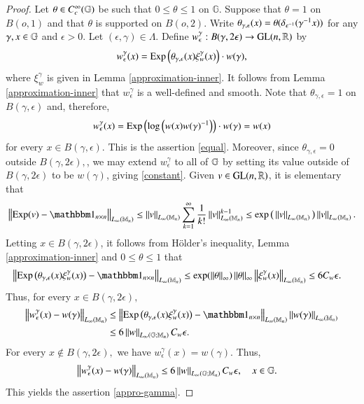 \documentclass[leqno]{amsart}
\begin{document}
	\begin{proof} Let $\theta\in C_{c}^{\infty}(\mathbb{G})$ be such that $0\leq\theta\leq 1$ on $\mathbb{G}.$ Suppose that $\theta=1$ on $B(o,1)$ and that $\theta$ is supported on $B(o,2).$ Write $\theta_{\gamma,\epsilon}(x)=\theta(\delta_{\epsilon^{-1}}(\gamma^{-1}x))$ for any $\gamma,x\in\mathbb{G}$ and $\epsilon>0$. Let $(\epsilon, \gamma)\in\Lambda$. Define $w^\gamma_\epsilon:B(\gamma, 2\epsilon)\to{\rm GL}(n,\mathbb{R})$ by
		\begin{align*}
			w^\gamma_\epsilon(x)=\operatorname{\rm Exp}\Big(\theta_{\gamma,\epsilon}(x)\xi^{\gamma}_{w}(x)\Big)\cdot w(\gamma),
		\end{align*}
		where $\xi^{\gamma}_{w}$ is given in Lemma \ref{approximation-inner}. It follows from Lemma \ref{approximation-inner} that $w^\gamma_\epsilon$ is a well-defined and smooth. Note that $\theta_{\gamma,\epsilon}=1$ on $B(\gamma,\epsilon)$ and, therefore, 
		\begin{align*}
			w^\gamma_\epsilon(x)=\operatorname{\rm Exp}\Big(\!\log\Big(w(x)w(\gamma)^{-1}\Big)\Big)\cdot w(\gamma)=w(x)
		\end{align*}
		for every $x\in B(\gamma,\epsilon).$ This is the assertion \eqref{equal}. Moreover, since $\theta_{\gamma,\epsilon}=0$ outside $B(\gamma,2\epsilon),$, we may extend $w^\gamma_\epsilon$ to all of $\mathbb{G}$ by setting its value outside of $B(\gamma, 2\epsilon)$ to be $w(\gamma)$, giving \eqref{constant}. Given $v\in{\rm GL}(n,\mathbb{R})$, it is elementary that
		\begin{align*}
			\Norm{\Exp(v)-\unit_{n\times n}}_{\lm{n}}
			\leq\Norm{v}_{\lm{n}}\sum_{k=1}^{\infty}\frac{1}{k!}\Norm{v}_{\lm{n}}^{k-1}
			\leq \exp\big(\Norm{v}_{\lm{n}}\big)\Norm{v}_{\lm{n}}.
		\end{align*}
		Letting $x\in B(\gamma,2\epsilon)$, it follows from H\"{o}lder's inequality, Lemma \ref{approximation-inner} and $0\leq\theta\leq1$ that
		\begin{align*}
			\Norm{\Exp\big(\theta_{\gamma,\epsilon}(x)\xi^{\gamma}_{w}(x)\big)-\unit_{n\times n}}_{\lm{n}}
			&\leq \exp(\Norm{\theta}_{\infty})\Norm{\theta}_{\infty}\Norm{\xi^{\gamma}_{w}(x)}_{\lm{n}}\leq6C_{w}\epsilon.
		\end{align*}
		Thus, for every $x\in B(\gamma,2\epsilon),$
		\begin{align*}
			\Norm{w^\gamma_\epsilon(x)-w(\gamma)}_{\lm{n}}
			&\leq\Norm{\Exp\big(\theta_{\gamma,\epsilon}(x)\xi^{\gamma}_{w}(x)\big)-\unit_{n\times n}}_{\lm{n}}
			\Norm{w(\gamma)}_{\lm{n}}\\
			&\leq6\Norm{w}_{\lgm{n}}C_{w}\epsilon.
		\end{align*}
		For every $x\notin B(\gamma,2\epsilon),$ we have $w^\gamma_\epsilon(x)=w(\gamma).$ Thus,
		\begin{align*}
			\left\| w^\gamma_\epsilon(x)-w(\gamma) \right\|_{L_{\infty}(\mathbb{M}_{n})}&\leq6\left\| w \right\|_{L_{\infty}(\mathbb{G};\mathbb{M}_{n})}C_{w}\epsilon,\quad x\in\mathbb{G}.
		\end{align*}
		This yields the assertion \eqref{appro-gamma}.
		

\end{proof}
\end{document}
